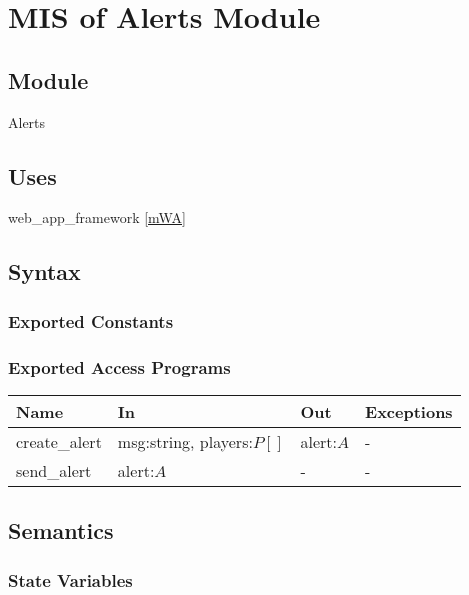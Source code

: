 \documentclass[12pt, titlepage]{article}
\begin{document}
\newpage

\section{MIS of Alerts Module} \label{mAL}

\subsection{Module}

Alerts

\subsection{Uses}

web\_app\_framework \ref{mWA}

\subsection{Syntax}

\subsubsection{Exported Constants}

\subsubsection{Exported Access Programs}

\begin{center}
\begin{tabular}{p{3cm} p{5cm} p{2cm} p{2cm}}
\hline
\textbf{Name} & \textbf{In} & \textbf{Out} & \textbf{Exceptions} \\
\hline
create\_alert & msg:string, players:$P[]$ & alert:$A$ & - \\
send\_alert & alert:$A$ & - & - \\
\hline
\end{tabular}
\end{center}

\subsection{Semantics}

\subsubsection{State Variables}
\end{document}
